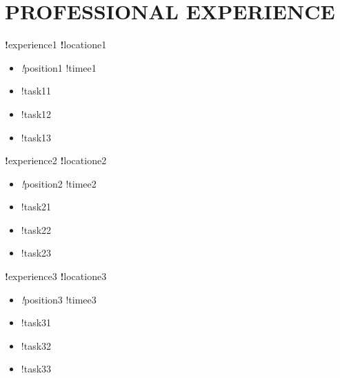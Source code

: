 \documentclass[a4paper,8pt]{article}
\begin{document}
    \section{PROFESSIONAL EXPERIENCE}
        \textbf !experience1 \hfill \textbf !locatione1 \\[-3ex]
    \begin{itemize}[label={\large\textbullet}, left=0pt, itemsep=0.5ex, parsep=0.5ex]
        \item \textit !position1 \hfill  !timee1 \\[-3ex]
    
    \end{itemize}
    \begin{itemize}[label=$\circ$,itemsep=0.5ex,parsep=0.5ex]
        \item !task11
        \item !task12
        \item !task13
    \end{itemize}
    
        \textbf !experience2 \hfill \textbf !locatione2 \\[-3ex]
    \begin{itemize}[label={\large\textbullet}, left=0pt, itemsep=0.5ex, parsep=0.5ex]
        \item \textit!position2 \hfill  !timee2 \\[-3ex]
    
    \end{itemize}
    \begin{itemize}[label=$\circ$,itemsep=0.5ex,parsep=0.5ex]
        \item !task21
        \item !task22
        \item !task23
    \end{itemize}
    
        \textbf !experience3 \hfill \textbf !locatione3 \\[-3ex]
    \begin{itemize}[label={\large\textbullet}, left=0pt, itemsep=0.5ex, parsep=0.5ex]
        \item \textit !position3 \hfill  !timee3 \\[-3ex]
    
    \end{itemize}
    \begin{itemize}[label=$\circ$,itemsep=0.5ex,parsep=0.5ex]
        \item !task31
        \item !task32
        \item !task33
    \end{itemize}
    
\end{document}
